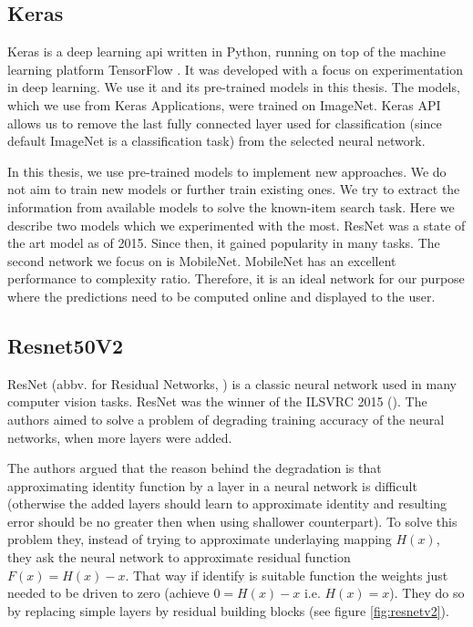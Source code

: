 \subsection{Keras}

Keras \citep{chollet2015keras} is a deep learning \acrshort{api} written in Python, running on top of the machine learning platform TensorFlow \citep{tensorflow2015-whitepaper}. It was developed with a focus on experimentation in deep learning. We use it and its pre-trained models in this thesis. The models, which we use from Keras Applications, were trained on ImageNet. Keras API allows us to remove the last fully connected layer used for classification (since default ImageNet is a classification task) from the selected neural network.

In this thesis, we use pre-trained models to implement new approaches. We do not aim to train new models or further train existing ones. We try to extract the information from available models to solve the known-item search task. Here we describe two models which we experimented with the most. ResNet was a state of the art model as of 2015. Since then, it gained popularity in many tasks. The second network we focus on is MobileNet. MobileNet has an excellent performance to complexity ratio. Therefore, it is an ideal network for our purpose where the predictions need to be computed online and displayed to the user.

\subsection*{Resnet50V2}

ResNet (abbv. for Residual Networks, \cite{resnet}) is a classic neural network used in many computer vision tasks. ResNet was the winner of the ILSVRC 2015 (\citep{ILSVRC15}). The authors aimed to solve a problem of degrading training accuracy of the neural networks, when more layers were added. 

The authors argued that the reason behind the degradation is that approximating identity function by a layer in a neural network is difficult (otherwise the added layers should learn to approximate identity and resulting error should be no greater then when using shallower counterpart). To solve this problem they, instead of trying to approximate underlaying mapping $H(x)$, they ask the neural network to approximate residual function $F(x)=H(x) - x$. That way if identify is suitable function the weights just needed to be driven to zero (achieve $0 = H(x) - x$ i.e. $H(x) = x$). They do so by replacing simple layers by residual building blocks (see figure \ref{fig:resnetv2}).

